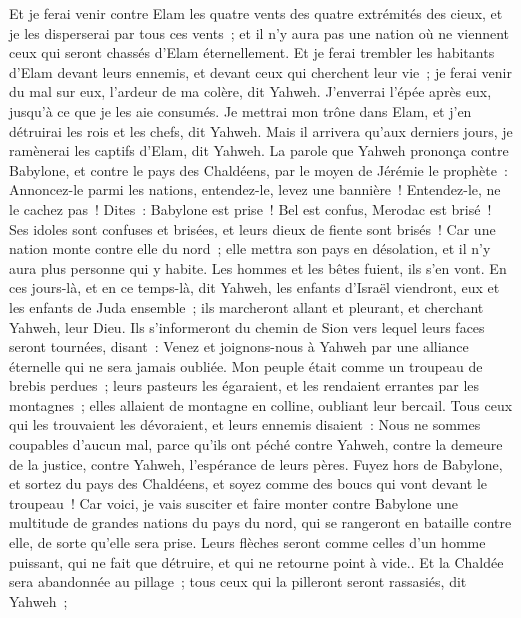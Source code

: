 \begin{multicols}{2}
Et je ferai venir contre Elam les quatre vents des quatre extrémités des cieux, et je les disperserai par tous ces vents~; et il n'y aura pas une nation où ne viennent ceux qui seront chassés d'Elam éternellement.
Et je ferai trembler les habitants d'Elam devant leurs ennemis, et devant ceux qui cherchent leur vie~; je ferai venir du mal sur eux, l'ardeur de ma colère, dit Yahweh. J'enverrai l'épée après eux, jusqu'à ce que je les aie consumés.
Je mettrai mon trône dans Elam, et j'en détruirai les rois et les chefs, dit Yahweh.
Mais il arrivera qu'aux derniers jours, je ramènerai les captifs d'Elam, dit Yahweh.
\VerseOne{}La parole que Yahweh prononça contre Babylone, et contre le pays des Chaldéens, par le moyen de Jérémie le prophète~:
Annoncez-le parmi les nations, entendez-le, levez une bannière~! Entendez-le, ne le cachez pas~! Dites~: Babylone est prise~! Bel est confus, Merodac est brisé~! Ses idoles sont confuses et brisées, et leurs dieux de fiente sont brisés~!
Car une nation monte contre elle du nord~; elle mettra son pays en désolation, et il n'y aura plus personne qui y habite. Les hommes et les bêtes fuient, ils s'en vont.
En ces jours-là, et en ce temps-là, dit Yahweh, les enfants d'Israël viendront, eux et les enfants de Juda ensemble~; ils marcheront allant et pleurant, et cherchant Yahweh, leur Dieu.
Ils s'informeront du chemin de Sion vers lequel leurs faces seront tournées, disant~: Venez et joignons-nous à Yahweh par une alliance éternelle qui ne sera jamais oubliée.
Mon peuple était comme un troupeau de brebis perdues~; leurs pasteurs les égaraient, et les rendaient errantes par les montagnes~; elles allaient de montagne en colline, oubliant leur bercail.
Tous ceux qui les trouvaient les dévoraient, et leurs ennemis disaient~: Nous ne sommes coupables d'aucun mal, parce qu'ils ont péché contre Yahweh, contre la demeure de la justice, contre Yahweh, l'espérance de leurs pères.
Fuyez hors de Babylone, et sortez du pays des Chaldéens, et soyez comme des boucs qui vont devant le troupeau~!
Car voici, je vais susciter et faire monter contre Babylone une multitude de grandes nations du pays du nord, qui se rangeront en bataille contre elle, de sorte qu'elle sera prise. Leurs flèches seront comme celles d'un homme puissant, qui ne fait que détruire, et qui ne retourne point à vide..
Et la Chaldée sera abandonnée au pillage~; tous ceux qui la pilleront seront rassasiés, dit Yahweh~;

\end{multicols}
